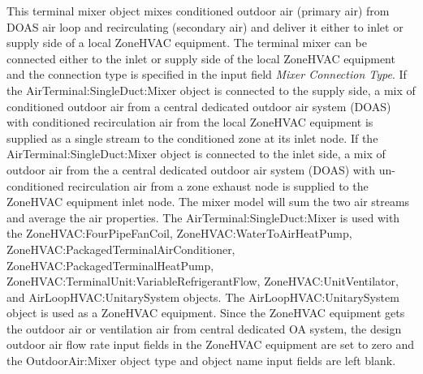 This terminal mixer object mixes conditioned outdoor air (primary air) from DOAS air loop and recirculating (secondary air) and deliver it either to inlet or supply side of a local ZoneHVAC equipment. The terminal mixer can be connected either to the inlet or supply side of the local ZoneHVAC equipment and the connection type is specified in the input field \textit{Mixer Connection Type}. If the AirTerminal:SingleDuct:Mixer object is connected to the supply side, a mix of conditioned outdoor air from a central dedicated outdoor air system (DOAS) with conditioned recirculation air from the local ZoneHVAC equipment is supplied as a single stream to the conditioned zone at its inlet node. If the AirTerminal:SingleDuct:Mixer object is connected to the inlet side, a mix of outdoor air from the a central dedicated outdoor air system (DOAS) with un-conditioned recirculation air from a zone exhaust node is supplied to the ZoneHVAC equipment inlet node. The mixer model will sum the two air streams and average the air properties. The AirTerminal:SingleDuct:Mixer is used with the ZoneHVAC:FourPipeFanCoil, ZoneHVAC:WaterToAirHeatPump, ZoneHVAC:PackagedTerminalAirConditioner, ZoneHVAC:PackagedTerminalHeatPump, ZoneHVAC:TerminalUnit:VariableRefrigerantFlow, ZoneHVAC:UnitVentilator, and AirLoopHVAC:UnitarySystem objects. The AirLoopHVAC:UnitarySystem object is used as a ZoneHVAC equipment. Since the ZoneHVAC equipment gets the outdoor air or ventilation air from central dedicated OA system, the design outdoor air flow rate input fields in the ZoneHVAC equipment are set to zero and the OutdoorAir:Mixer object type and object name input fields are left blank.

